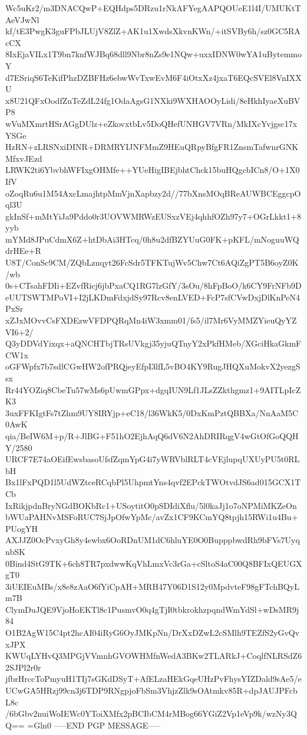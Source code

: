 Wc5uKr2/m3DNACQwP+EQHdps5DRzu1rNkAFYegAAPQOUeE1l4I/UMUKtTAeVJwNl
kf/tE3PwgK3guFPbJLUjV8ZlZ+AK1u1XwdsXkvnKWn/+itSVBy6h/sz0GC5RAcCX
8IxEjaVILx1T9bn7knfWJBq68dll9Nbr8nZs9e1NQw+uxxIDNW0wYA1uBytemmoY
d7ESriqS6TeKifPhzDZBFHz6ebwWvTxwEvM6F4iOtxXz4jxaT6EQcSVEl8VnIXXU
x8U21QFxOodfZuTeZdL24fg1OdaAgsG1NXki9WXHAOOyLidi/8eHkhIyaeXuBVP8
wVuMXmrtHSrAGgDUlz+eZkovxtbLv5DoQHefUNHGV7VRn/MkIXcYvjgsc17xYSGe
HzRN+zLRSNxiDINR+DRMRYIJNFMmZ9HEuQRpyBfgFR1ZnsmTafwnrGNKMfxvJEzd
LRWK2ti6YbvbhWFIxgOHMfe++YUeHigIBEjbhtChck15buHQgcbICn8/O+1X0IfV
oZoqRu6u1M54AxcLmajhtpMmVjnXapbzy2d//77bXnsMOqBReAUWBCEggcpOql3U
gkInSf+mMtYiJa9Pddo0r3UOVWMRWzEUSxzVEj4qhhfOZh97y7+OGrLkkt1+8yyb
mYMd8JPuCdmX6Z+htDbAi3HTcq/0h8u2dfBZYUuG0FK+pKFL/mNoguuWQdrHEe+R
U8T/ConSc9CM/ZQbLznqyt26FcSdr5TFKTujWv5Chw7Ct6AQiZgPT5B6oyZ0K/wb
0s+CTsahFDIi+EZvfRicj6jbPxaCQ1RG7lzGfY/3sOu/8hFpBoO/k6CY9FrNFb9D
eUUTSWTMPoVI+I2jLKDmFdxjdSy97Rcv8enLVED+FcP7sfCVwDxjDlKnPeN4PxSr
xZJxMOvvCsFXDEzwVFDPQRqMn4iW3xmm01/fs5/il7Mr6VyMMZYieuQyYZVI6+2/
Q3yDDVdYixqx+aQNCHTbjTRsUVkgj35yjuQTnyY2xPkfHMeb/XGciHkaGkmFCW1x
oGFWpfx7b7sdlCGwHW2ofPRQjeyEfpI3lfL5vBO4KY9RugJHQXuMokvX2yezgSsx
Rr44YOZiq8CbeTu57wMs6pUwmGPpx+dgqIUN9Lf1JLsZZkthgmz1+9AITLpIcZK3
3uxFFKIgtFs7tZhm9UY8IRYjp+eC18/l36WkK5/0DxKmPztQBBXa/NnAaM5C0AwK
qia/BeIW6M+p/R+JlBG+F51hO2EjhAqQ6dV6N2AhDRIRqgV4wGtOfGoQQHY/2580
URCF7E74aOEifEwsbasoUfsfZqmYpG4i7yWRVblRLT4cVEjlupqUXUyPU5t0RLbH
Bx1lFxPQD1l5UdWZtceRCqbPl5UhpmtYns4qvf2EPckTWOtvdJS6ad015GCX1TCb
IxRikjpdnBryNGdBOKbRc1+USoytitO0pSDIdiXflu/5l0kaJj1o7oNPMiMKZeOn
bWUaPAHNvMSFoRUC7SjJpOfwYpMc/avZx1CF9KCmYQ8tpjh15RWi1u4Bu+PUogYH
AXJJZ0OcPvxyGh8y4ewbx6OoRDnUM1dC6hluYE0O0BupppbwdRh9bFVs7UyqnbSK
0Bind4StG9TK+6ch8TR7pxdwwKqVhLmxVc3rGa+cSltoS4aC00Q8BFIxQEUGXgT0
3iUEIEuMBs/x8e8zAaO6fYiCpAH+MRH47Y06D1S12y0MpdvteF98gFTchBQyLm7B
ClymDuJQE9VjoHoEKTl8c1PusmvO0q4gTjI0tbkrokhzpqndWmYdSl+wDsMR9j84
O1B2AgW15C4pt2hcAI04iRyG6OyJMKpNn/DrXxDZwL2cSMlh9TEZfS2yGvQvxJPX
KWUqLYHvQ3MPGjVVmnhGVOWHMfnWedA3BKw2TLARkJ+CoqlfNLRSdZ62SJPl2r0r
jfbrHrccToPmyuH1TIj7sGKdDSyT+AfELzaHEkGqeUHzPvFhysYIZDald9sAe5/e
UCwGA5HRzj99cn3j6TDP9RNgpjoFbSm3VhjzZlk9sOAtmkv85R+dpJAUJPFcbL8c
/6bGbv2nuiWoIEWc0YToiXMfx2pBCIbCM4rMBog66YGiZ2Vp1eVp9k/wzNy3QQ==
=Gln0
-----END PGP MESSAGE-----
